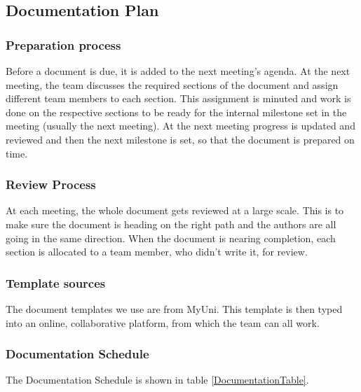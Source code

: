 \documentclass[12pt,a4paper]{article}
\begin{document}
\subsection{Documentation Plan}
\subsubsection{Preparation process}
Before a document is due, it is added to the next meeting's agenda. At the next meeting, the team discusses the required sections of the document and assign different team members to each section. This assignment is minuted and work is done on the respective sections to be ready for the internal milestone set in the meeting (usually the next meeting). At the next meeting progress is updated and reviewed and then the next milestone is set, so that the document is prepared on time.
\subsubsection{Review Process}
At each meeting, the whole document gets reviewed at a large scale. This is to make sure the document is heading on the right path and the authors are all going in the same direction. When the document is nearing completion, each section is allocated to a team member, who didn't write it, for review.
\subsubsection{Template sources}
The document templates we use are from MyUni. This template is then typed into an online, collaborative platform, from which the team can all work.

\subsubsection{Documentation Schedule}
The Documentation Schedule is shown in table \ref{DocumentationTable}.
	
\end{document}
